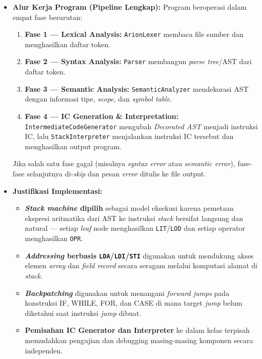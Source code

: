 \documentclass[12pt, a4paper]{article}
\begin{document}
\begin{itemize}
    \item \textbf{Alur Kerja Program (Pipeline Lengkap):}
    Program beroperasi dalam empat fase berurutan:
    \begin{enumerate}
        \item \textbf{Fase 1 --- Lexical Analysis:} \texttt{ArionLexer} membaca file sumber dan menghasilkan daftar token.
        \item \textbf{Fase 2 --- Syntax Analysis:} \texttt{Parser} membangun \textit{parse tree}/AST dari daftar token.
        \item \textbf{Fase 3 --- Semantic Analysis:} \texttt{SemanticAnalyzer} mendekorasi AST dengan informasi tipe, \textit{scope}, dan \textit{symbol table}.
        \item \textbf{Fase 4 --- IC Generation \& Interpretation:} \texttt{IntermediateCodeGenerator} mengubah \textit{Decorated AST} menjadi instruksi IC, lalu \texttt{StackInterpreter} menjalankan instruksi IC tersebut dan menghasilkan output program.
    \end{enumerate}
    Jika salah satu fase gagal (misalnya \textit{syntax error} atau \textit{semantic error}), fase-fase selanjutnya di-\textit{skip} dan pesan \textit{error} ditulis ke file output.
    
    \item \textbf{Justifikasi Implementasi:}
    \begin{itemize}
        \item \textbf{\textit{Stack machine} dipilih} sebagai model eksekusi karena pemetaan ekspresi aritmatika dari AST ke instruksi \textit{stack} bersifat langsung dan natural --- setiap \textit{leaf} node menghasilkan \texttt{LIT}/\texttt{LOD} dan setiap operator menghasilkan \texttt{OPR}.
        \item \textbf{\textit{Addressing} berbasis \texttt{LDA}/\texttt{LDI}/\texttt{STI}} digunakan untuk mendukung akses elemen \textit{array} dan \textit{field record} secara seragam melalui komputasi alamat di \textit{stack}.
        \item \textbf{\textit{Backpatching}} digunakan untuk menangani \textit{forward jumps} pada konstruksi IF, WHILE, FOR, dan CASE di mana target \textit{jump} belum diketahui saat instruksi \textit{jump} dibuat.
        \item \textbf{Pemisahan IC Generator dan Interpreter} ke dalam kelas terpisah memudahkan pengujian dan debugging masing-masing komponen secara independen.
    \end{itemize}
\end{itemize}
\end{document}
